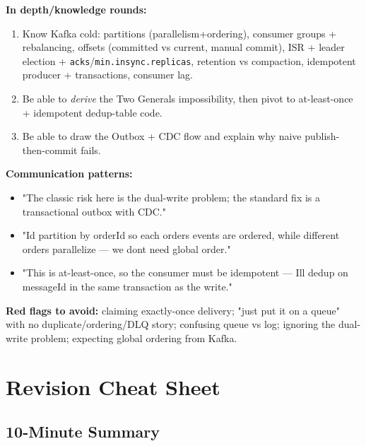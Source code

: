 \documentclass[11pt]{article}
\providecommand{\tightlist}{\setlength{\itemsep}{1pt}\setlength{\parskip}{0pt}}
\begin{document}
\textbf{In depth/knowledge rounds:}

\begin{enumerate}
\def\labelenumi{\arabic{enumi}.}
\tightlist
\item
  Know Kafka cold: partitions (parallelism+ordering), consumer groups + rebalancing, offsets (committed vs current, manual commit), ISR + leader election + \texttt{acks}/\texttt{min.insync.replicas}, retention vs compaction, idempotent producer + transactions, consumer lag.
\item
  Be able to \emph{derive} the Two Generals impossibility, then pivot to at-least-once + idempotent dedup-table code.
\item
  Be able to draw the Outbox + CDC flow and explain why naive publish-then-commit fails.
\end{enumerate}

\textbf{Communication patterns:}

\begin{itemize}
\tightlist
\item
  "The classic risk here is the dual-write problem; the standard fix is a transactional outbox with CDC."
\item
  "I\textquotesingle d partition by orderId so each order\textquotesingle s events are ordered, while different orders parallelize --- we don\textquotesingle t need global order."
\item
  "This is at-least-once, so the consumer must be idempotent --- I\textquotesingle ll dedup on messageId in the same transaction as the write."
\end{itemize}

\textbf{Red flags to avoid:} claiming exactly-once delivery; "just put it on a queue" with no duplicate/ordering/DLQ story; confusing queue vs log; ignoring the dual-write problem; expecting global ordering from Kafka.

\section{Revision Cheat Sheet}\label{revision-cheat-sheet}

\subsection{10-Minute Summary}\label{10-minute-summary}
\end{document}

